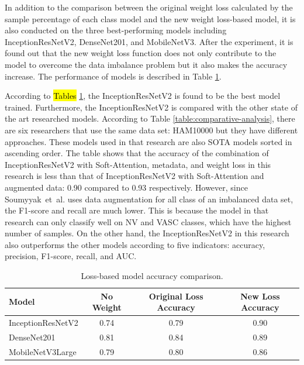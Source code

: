\documentclass[sensors,article,accept,pdftex,moreauthors]{Definitions/mdpi}
\begin{document}
	In addition to the comparison between the original weight loss calculated by the sample percentage of each class model and the new weight loss-based model, it is also conducted on the three best-performing models including InceptionResNetV2, DenseNet201, and MobileNetV3. After the experiment, it is found out that the new weight loss function does not only contribute to the model to overcome the data imbalance problem but it also makes the accuracy increase. The performance of models is described in Table \ref{table:loss-comparision}.
	
	According to \hl{Tables} %
	\ref{table:loss-comparision}, the InceptionResNetV2 is found to be the best model trained. Furthermore, the InceptionResNetV2 is compared with the other state of the art researched models. According to Table \ref{table:comparative-analysis}, there are six researchers that use the same data set: HAM10000 but they have  different approaches. These models used in that research are also SOTA models sorted in ascending order. The table shows that the accuracy of the combination of InceptionResNetV2 with Soft-Attention, metadata, and weight loss in this research is less than that of InceptionResNetV2 with Soft-Attention and augmented data: 0.90 compared to 0.93 respectively. However, since Soumyyak~et~al. uses data augmentation for all class of an imbalanced data set, the F1-score and recall are much lower. This is because the model in that research can only classify well on NV and VASC classes, which have the highest number of samples. On the other hand, the InceptionResNetV2 in this research also outperforms the other models according to five indicators: accuracy, precision, F1-score, recall, and AUC. 
	\begin{table}[H]
			\caption{Loss-based model accuracy comparison.}
		\label{table:loss-comparision}
	\setlength{\tabcolsep}{2.8mm}\begin{tabular}{ l  c  c  c }
\toprule
\textbf{Model} & \textbf{No Weight} & \textbf{Original Loss Accuracy} & \textbf{New Loss Accuracy}\\
\midrule
InceptionResNetV2 & 0.74 & 0.79 & 0.90\\
DenseNet201 & 0.81 & 0.84 & 0.89\\
MobileNetV3Large & 0.79 & 0.80 & 0.86\\
\bottomrule
		\end{tabular}
	\end{table} 
\unskip
\end{document}

